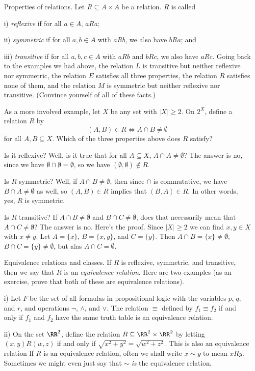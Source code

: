 \medskip\boldlabel Properties of relations. Let $R\subseteq A\times A$ be a relation. $R$ is called
\medskip
\item{i)} {\it reflexive} if for all $a\in A$, $aRa$;
\smallskip
\item{ii)} {\it symmetric} if for all $a,b\in A$ with $aRb$, we also have $bRa$; and
\smallskip
\item{iii)} {\it transitive} if for all $a,b,c\in A$ with $aRb$ and $bRc$, we also have $aRc$.
\medskip
Going back to the examples we had above, the relation $L$ is transitive but neither reflexive nor symmetric,
the relation $E$ satisfies all three properties, the relation $R$ satisfies none of them, and the relation
$M$ is symmetric but neither reflexive nor transitive. (Convince yourself of all of these facts.)

As a more involved example, let $X$ be any set with $|X|\ge 2$. On $2^X$, define a relation $R$ by
$$(A,B)\in R \Leftrightarrow A\cap B\ne \emptyset$$
for all $A,B\subseteq X$. Which of the three properties above does $R$ satisfy?

Is it reflexive? Well, is it true that for all $A\subseteq X$, $A\cap A \ne \emptyset$? The answer
is no, since we have $\emptyset \cap \emptyset = \emptyset$, so we have $(\emptyset, \emptyset)\notin R$.

Is $R$ symmetric? Well, if $A\cap B \ne \emptyset$, then since $\cap$ is commutative, we have
$B\cap A \ne \emptyset$ as well, so $(A,B)\in R$ implies that $(B,A)\in R$. In other words, yes, $R$ is symmetric.

Is $R$ transitive? If $A\cap B\ne \emptyset$ and $B\cap C\ne \emptyset$, does that necessarily mean
that $A\cap C\ne\emptyset$? The answer is no. Here's the proof. Since $|X|\ge 2$ we can find $x,y\in X$
with $x\ne y$. Let $A = \{x\}$, $B = \{x,y\}$, and $C = \{y\}$. Then $A\cap B = \{x\}\ne \emptyset$,
$B\cap C = \{y\}\ne \emptyset$, but alas $A\cap C = \emptyset$.

\medskip\boldlabel Equivalence relations and classes. If $R$ is reflexive, symmetric, and transitive, then we say
that $R$ is an {\it equivalence relation}. Here are two examples (as an exercise, prove that both of
these are equivalence relations).
\medskip
\item{i)} Let $F$ be the set of all formulas in propositional logic with the variables $p$, $q$, and $r$,
and operations $\neg$, $\wedge$, and $\vee$. The relation $\equiv$ defined by $f_1 \equiv f_2$
if and only if $f_1$ and $f_2$ have the same truth table is an equivalence relation.
\smallskip
\item{ii)} On the set $\RR^2$, define the relation $R \subseteq \RR^2\times \RR^2$ by letting
$(x,y) R (w,z)$ if and only if $\sqrt{x^2 + y^2} = \sqrt{w^2 + z^2}$. This is also an equivalence relation
\medskip
If $R$ is an equivalence relation, often we shall write $x\sim y$ to mean $xRy$. Sometimes we might
even just say that $\sim$ {\it is} the equivalence relation.

